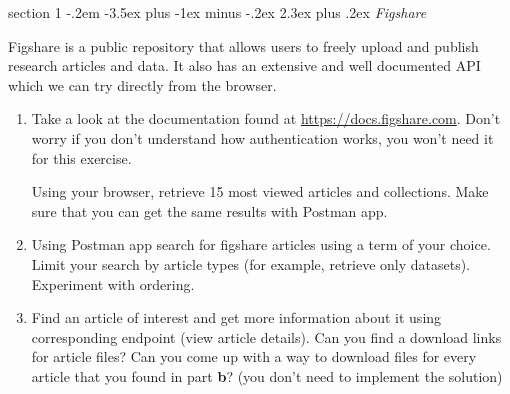 \documentclass[12pt]{article}
\makeatletter
\newenvironment{problem}{\@startsection
	{section}
	{1}
	{-.2em}
	{-3.5ex plus -1ex minus -.2ex}
	{2.3ex plus .2ex}
	{\pagebreak[3]%
		\large\bf\noindent{Exercise }
	}
}
{\vspace{0.8cm}}
\makeatother
\begin{document}
	
	\begin{problem}{\it Figshare}
		
	Figshare is a public repository that allows users to freely upload and publish research articles and data. It also has an extensive and well documented API which we can try directly from the browser.
	
	\begin{enumerate}[label=\textbf{\alph*)},leftmargin=*]
	\item Take a look at the documentation found at \url{https://docs.figshare.com}. Don't worry if you don't understand how authentication works, you won't need it for this exercise. 
	
	Using your browser, retrieve 15 most viewed articles and collections. Make sure that you can get the same results with Postman app.
	
	\item Using Postman app search for figshare articles using a term of your choice. Limit your search by article types (for example, retrieve only datasets). Experiment with ordering.
	
	\item Find an article of interest and get more information about it using corresponding endpoint (view article details). Can you find a download links for article files? Can you come up with a way to download files for every article that you found in part \textbf{b}? (you don't need to implement the solution)
	
	
	\end{enumerate}
	
		
	\end{problem}
\end{document}
